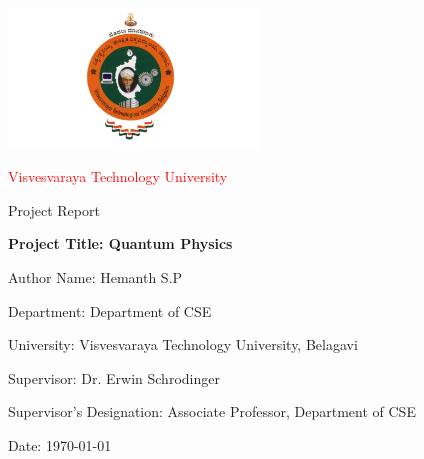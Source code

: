 \documentclass[a4paper,12pt]{report}
\begin{document}
\begin{titlepage}
\centering
\includegraphics[width=0.5\textwidth]{HemanthS_P.jpg}\par
\vspace{1cm}
{\LARGE\textcolor{red}{Visvesvaraya Technology University}\par}
\vspace{0.5cm}
{\Huge Project Report\par}
\vspace{1.5cm}
{\Huge \bfseries Project Title: Quantum Physics\par}
\vspace{1cm}
{\Large Author Name: Hemanth S.P\par}
{\Large Department: Department of CSE\par}
{\Large University: Visvesvaraya Technology University, Belagavi\par}
\vfill
{\large Supervisor: Dr. Erwin Schrodinger \par}
{\Large Supervisor's Designation: Associate Professor, Department of CSE\par}
\vspace{0.8cm}
{\Large Date: \today\par}
\end{titlepage}
\newpage
\end{document}
